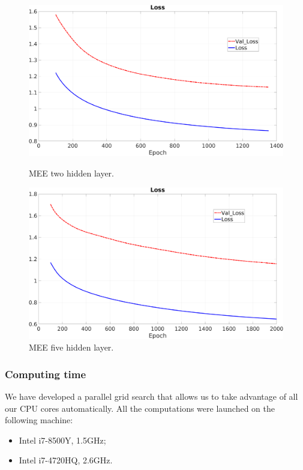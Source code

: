\vspace{0.5cm}
\begin{figure}[H]
	\centering
	\begin{minipage}[t]{0.5\linewidth}
		\includegraphics[width=\linewidth]{img/Cup_loss_Reg_Zoom_2l.png}
		\caption{MEE two hidden layer.}
		\label{img::twolayer}
	\end{minipage}%
	\begin{minipage}[t]{0.5\linewidth}
		\includegraphics[width=\linewidth]{img/Cup_loss_Reg_Zoom_5l.png}
		\caption{MEE five hidden layer.}
		\label{img::fivelayer}
	\end{minipage}
\end{figure}

\subsubsection{Computing time}
We have developed a parallel grid search that allows us to take advantage of all our CPU cores automatically. All the computations were launched on the following machine:
\begin{itemize}
	\item Intel i7-8500Y, 1.5GHz;
	\item Intel i7-4720HQ, 2.6GHz.
	
\end{itemize}

